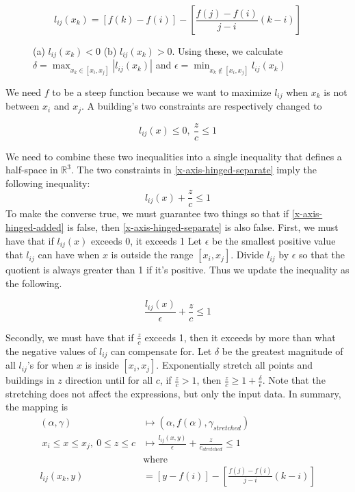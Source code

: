 \documentclass{NSF}
\begin{document}
\begin{equation*}
    l_{ij}(x_k) = [f(k) - f(i)] -[\frac{f(j)-f(i)}{j-i}(k - i)]
\end{equation*}


\begin{figure}[ht]

\caption{
(a) $l_{ij}(x_k) < 0$ (b) $l_{ij}(x_k) > 0$. Using these, we calculate $\delta = \displaystyle\max_{x_k \in [x_i,x_j]} |l_{ij}(x_k)|$  and $\epsilon = \displaystyle\min_{x_k \notin [x_i,x_j]} l_{ij}(x_k)$} 
\label{fig:buildings-graph}
\end{figure}

We need $f$ to be a steep function because we want to maximize $l_{ij}$ when $x_k$ is not between $x_i$ and $x_j$.
A building's two constraints are respectively changed to 

\begin{equation}\label{x-axis-hinged-separate}
    l_{ij}(x) \leq 0, \ \frac{z}{c} \leq 1
\end{equation}


We need to combine these two inequalities into a single inequality that defines a half-space in $\mathbb{R}^3$. 
The two constraints in \eqref{x-axis-hinged-separate} imply the following inequality:
\begin{equation}\label{x-axis-hinged-added}
    l_{ij}(x) + \frac{z}{c} \leq 1 
\end{equation}
To make the converse true, we must guarantee two things so that if \eqref{x-axis-hinged-added} is false, then \eqref{x-axis-hinged-separate} is also false. First, we must have that if $l_{ij}(x)$ exceeds 0, it exceeds 1  Let $\epsilon$ be the smallest positive value that $l_{ij}$ can have when $x$ is outside the range $[x_i,x_j]$. Divide  $l_{ij}$ by $\epsilon$ so that the quotient is always greater than 1 if it's positive. Thus we update the inequality as the following.

\begin{equation*}
	\frac{l_{ij}(x)}{\epsilon} + \frac{z}{c} \leq 1
\end{equation*}

Secondly, we must have that if $\frac{z}{c}$ exceeds 1, then it exceeds by more than what the negative values of  $l_{ij}$ can compensate for. Let $\delta$ be the greatest magnitude of all $l_{ij}$'s for when $x$ is inside $[x_i,x_j]$. Exponentially stretch all points and buildings in $z$ direction until for all $c$, if $\frac{z}{c} > 1$, then $\frac{z}{c} \geq 1+\frac{\delta}{\epsilon}$.  Note that the stretching does not affect the expressions, but only the input data. In summary, the mapping is
\begin{align*}
(\alpha,\gamma) & \mapsto (\alpha,f(\alpha),\gamma_{stretched}) \\
\ x_i \leq x \leq x_j,\ 0 \leq z \leq c & \mapsto \frac{l_{ij}(x,y)}{\epsilon} + \frac{z}{c_{stretched}} \leq 1 \\
& \text{where} \\
l_{ij}(x_k,y) & =  [y - f(i)] -[\frac{f(j)-f(i)}{j-i}(k - i)]
\end{align*}
\end{document}
